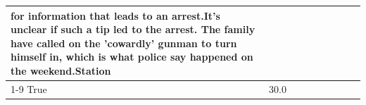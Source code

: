 \begin{table}[H]
\begin{tabular}{lllrlllll}
for information that leads to an arrest.It's unclear if such a tip led to the arrest. The family have called on the 'cowardly' gunman to turn himself in, which is what police say happened on the weekend.Station \\
\cline{1-9}
True & 30.0%
\end{tabular}
\end{table}
